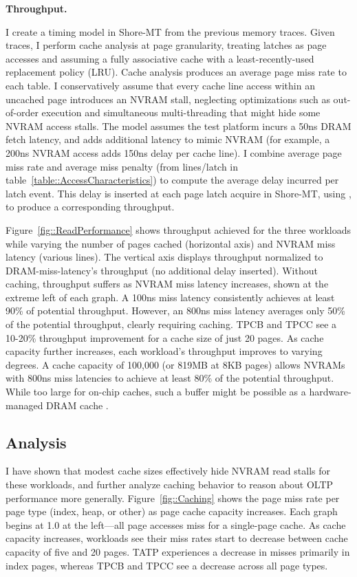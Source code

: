 \textbf{Throughput.}

I create a timing model in Shore-MT from the previous memory traces.
Given traces, I perform cache analysis at page granularity, treating latches as page accesses and assuming a fully associative cache with a least-recently-used replacement policy (LRU).
Cache analysis produces an average page miss rate to each table.
I conservatively assume that every cache line access within an uncached page introduces an NVRAM stall, neglecting optimizations such as out-of-order execution and simultaneous multi-threading that might hide some NVRAM access stalls. 
The model assumes the test platform incurs a 50ns DRAM fetch latency, and adds additional latency to mimic NVRAM (for example, a 200ns NVRAM access adds 150ns delay per cache line).
I combine average page miss rate and average miss penalty (from lines/latch in table~\ref{table::AccessCharacteristics}) to compute the average delay incurred per latch event.
This delay is inserted at each page latch acquire in Shore-MT, using \InPlace, to produce a corresponding throughput.

Figure~\ref{fig::ReadPerformance} shows throughput achieved for the three workloads while varying the number of pages cached (horizontal axis) and NVRAM miss latency (various lines).
The vertical axis displays throughput normalized to DRAM-miss-latency's throughput (no additional delay inserted).
Without caching, throughput suffers as NVRAM miss latency increases, shown at the extreme left of each graph.
A 100ns miss latency consistently achieves at least 90\% of potential throughput.
However, an 800ns miss latency averages only 50\% of the potential throughput, clearly requiring caching.
TPCB and TPCC see a 10-20\% throughput improvement for a cache size of just 20 pages.
As cache capacity further increases, each workload's throughput improves to varying degrees.
A cache capacity of 100,000 (or 819MB at 8KB pages) allows NVRAMs with 800ns miss latencies to achieve at least 80\% of the potential throughput.
While too large for on-chip caches, such a buffer might be possible as a hardware-managed DRAM cache \cite{QureshiSrinivasan09}.

\subsection{Analysis}
\label{sec:OLTP_eval:Reads:Analysis}

I have shown that modest cache sizes effectively hide NVRAM read stalls for these workloads, and further analyze caching behavior to reason about OLTP performance more generally.
Figure~\ref{fig::Caching} shows the page miss rate per page type (index, heap, or other) as page cache capacity increases.
Each graph begins at 1.0 at the left---all page accesses miss for a single-page cache.
As cache capacity increases, workloads see their miss rates start to decrease between cache capacity of five and 20 pages.
TATP experiences a decrease in misses primarily in index pages, whereas TPCB and TPCC see a decrease across all page types.

